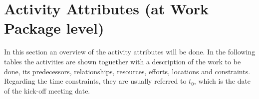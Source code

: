 \chapter{Activity Attributes (at Work Package level)}
In this section an overview of the activity attributes will be done. In the following tables the activities are shown toguether with a description of the work to be done, its predecessors, relationships, resources, efforts, locations and constraints. Regarding the time constraints, they are usually referred to $t_{0}$, which is the date of the kick-off meeting date.







